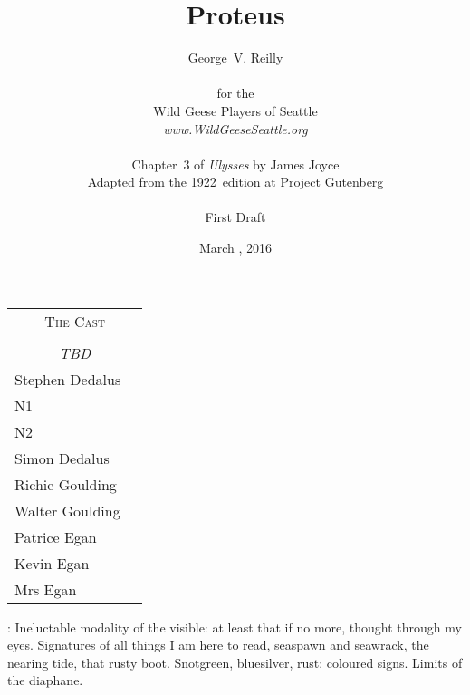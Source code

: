 


\title{\Huge Proteus}
\author{George~V. Reilly\\
\\
{\small for the}\\
Wild Geese Players of Seattle\\
{\emph{www.WildGeeseSeattle.org}}\\
\\
{\small Chapter~3 of \emph{Ulysses} by James Joyce}\\
{\small Adapted from the 1922~edition at Project Gutenberg}
\\
\\
{\small First Draft}}
\date{March , 2016}
\raggedbottom



\maketitle
\thispagestyle{empty}
\pagebreak

\begin{tabular}{lp{10cm}}
    \multicolumn{2}{c}{\Large \textsc{The Cast}} \\
\\
    \multicolumn{2}{c}{\large \textit{TBD}} \\
Stephen Dedalus \\
N1 \\
N2 \\
Simon Dedalus \\
Richie Goulding \\
Walter Goulding \\
Patrice Egan \\
Kevin Egan \\
Mrs Egan \\
\end{tabular}

\thispagestyle{empty}
\newpage


\setcounter{page}{1}


\StephenInt:
Ineluctable modality of the visible:
at least that if no more, thought through my eyes.
Signatures of all things I am here to read,
seaspawn and seawrack,
the nearing tide,
that rusty boot.
Snotgreen, bluesilver, rust:
coloured signs.
Limits of the diaphane.


